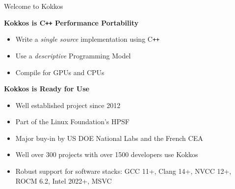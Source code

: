 




\begin{frame}{Welcome to Kokkos}

\textbf{Kokkos is C\texttt{++} Performance Portability}
\begin{scriptsize}
  \begin{itemize} 
	  \item {Write a \textit{single source} implementation using C\texttt{++}}
	  \item {Use a \textit{descriptive} Programming Model}
	  \item {Compile for GPUs and CPUs}
  \end{itemize}
\end{scriptsize}

	\vspace{10pt}

\textbf{Kokkos is Ready for Use}
\begin{scriptsize}
  \begin{itemize}
          \item {Well established project since 2012}
          \item {Part of the Linux Foundation's HPSF}
	  \item {Major buy-in by US DOE National Labs and the French CEA}
	  \item {Well over 300 projects with over 1500 developers use Kokkos}
	  \item {Robust support for software stacks: GCC 11+, Clang 14+, NVCC 12+, ROCM 6.2, Intel 2022+, MSVC}
  \end{itemize}
\end{scriptsize}

\end{frame}


